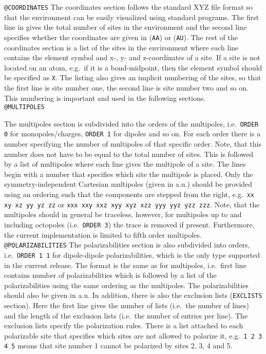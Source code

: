 \noindent\texttt{@COORDINATES}\newline
The coordinates section follows the standard XYZ file format so that the
environment can be easily visualized using standard programs. The first line in
gives the total number of sites in the environment and the second line
specifies whether the coordinates are given in \angstrom{} (\verb|AA|) or
\bohr{} (\verb|AU|). The rest of the coordinates section is a list of the sites in
the environment where each line contains the element symbol and x-, y- and
z-coordinates of a site. If a site is not located on an atom, e.g.\ if it is a
bond-midpoint, then the element symbol should be specified as \verb|X|. The
listing also gives an implicit numbering of the sites, so that the first line
is site number one, the second line is site number two and so on. This
numbering is important and used in the following sections.\\

\noindent\texttt{@MULTIPOLES}\newline

The multipoles section is subdivided into the orders of the
multipoles, i.e.\ \verb|ORDER 0| for monopoles/charges, \verb|ORDER 1|
for dipoles and so on.  For each order there is a number specifying
the number of multipoles of that specific order. Note, that this
number does not have to be equal to the total number of sites. This is
followed by a list of multipoles where each line gives the multipole
of a site. The lines begin with a number that specifies which site the
multipole is placed. Only the symmetry-independent Cartesian
multipoles (given in a.u.) should be provided using an ordering such
that the components are stepped from the right, e.g.\
\verb|xx xy xz yy yz zz| or \verb|xxx xxy xxz xyy xyz xzz yyy yyz yzz zzz|.
Note, that the multipoles should in general be traceless, however, for
multipoles up to and including octopoles (i.e.\ \verb|ORDER 3|) the
trace is removed if present. Furthermore,
the current implementation is limited to fifth order multipoles.\\

\noindent\texttt{@POLARIZABILITIES}\newline
The polarizabilities section is also subdivided into orders,
i.e.\ \verb|ORDER 1 1| for dipole-dipole polarizabilities, which is the only
type supported in the current release. The format is the same as for
multipoles, i.e.\ first line contains number of polarizabilities which is
followed by a list of the polarizabilities using the same ordering as the
multipoles. The polarizabilities should also be given in a.u. In addition,
there is also the exclusion lists (\verb|EXCLISTS|
section). Here the first line gives the number of lists (i.e.\ the number of
lines) and the length of the exclusion lists (i.e.\ the number of entries per
line). The exclusion lists specify the polarization rules. There is a list
attached to each polarizable site that specifies which sites are not allowed
to polarize it, e.g.\ \verb|1 2 3 4 5| means that site number 1 cannot be
polarized by sites 2, 3, 4 and 5.\\

